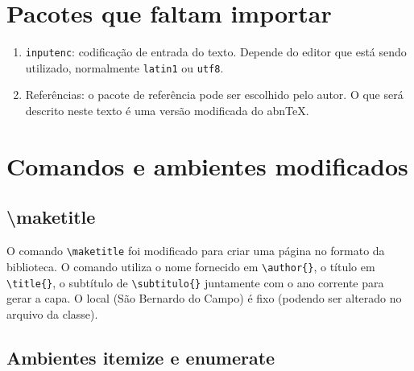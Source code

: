 \section{Pacotes que faltam importar}

    \begin{enumerate}
        \item\verb+inputenc+: codificação de entrada do texto. Depende do editor que está sendo utilizado, normalmente \texttt{latin1} ou \texttt{utf8}.
        \item Referências: o pacote de referência pode ser escolhido pelo autor. O que será descrito neste texto é uma versão modificada do abn\TeX.
    \end{enumerate}

\section{Comandos e ambientes modificados}
    
    \subsection{\textbackslash maketitle}
    
    O comando \verb+\maketitle+ foi modificado para criar uma página no formato da biblioteca. O comando utiliza o nome fornecido em \verb+\author{}+, o título em \verb+\title{}+, o subtítulo de \verb+\subtitulo{}+ juntamente com o ano corrente para gerar a capa. O local (São Bernardo do Campo) é fixo (podendo ser alterado no arquivo da classe).


    \subsection{Ambientes itemize e enumerate}
    
